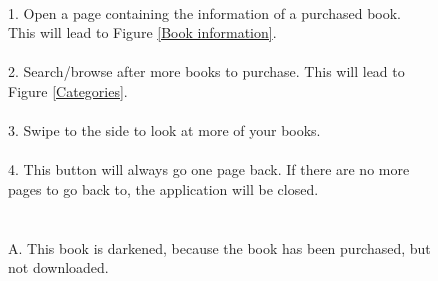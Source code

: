 \message{ !name(Rapport.tex)}\documentclass[12pt]{article}
\begin{document}
\begin{figure}
\caption{
\\
1. Open a page containing the information of a purchased book. This will lead to Figure \ref{Book information}.\\\\
2. Search/browse after more books to purchase. This will lead to Figure \ref{Categories}.\\\\
3. Swipe to the side to look at more of your books.\\\\
4. This button will always go one page back. If there are no more pages to go back to, the application will be closed.\\\\\\
A. This book is darkened, because the book has been purchased, but not downloaded.
}
\label{Front page}
\end{figure}
\end{document}
